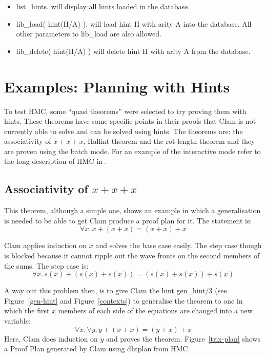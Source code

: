 \begin{itemize}

\item list\_hints. will display all hints loaded in the database.

\item lib\_load( hint(H/A) ). will load hint H with arity A into the
database. All other parameters to lib\_load are also allowed.

\item lib\_delete( hint(H/A) ) will delete hint H with arity A from the
database.

\end{itemize}

\section{Examples: Planning with Hints}

        To test HMC, some ``quasi theorems'' were selected to try
proving them with hints. These theorems have some specific points in
their proofs that Clam is not currently able to solve and can be solved
using hints. The theorems are: the associativity of $x+x+x$, Halfint
theorem and the rot-length theorem and they are proven using the batch
mode. For an example of the interactive mode refer to the long
description of HMC in \cite{negrete-msc}.


\subsection{Associativity of $x+x+x$}

        This theorem, although a simple one, shows an example in which a
generalisation is needed to be able to get Clam produce a proof plan
for it. The statement is:
\begin{equation}
\label{trix-thm}
\forall x.\, x + ( x + x) = (x + x ) + x 
\end{equation}

        Clam applies induction on $x$ and solves the base case easily.
The step case though is blocked because it cannot ripple out the wave
fronts on the second members of the sums. The step case is:
\begin{equation} \label{trix-step} \forall x.\, s(x) + ( s(x) + s(x) )
= ( s(x) + s(x) ) + s(x) \end{equation}

        A way out this problem then, is to give Clam the hint
gen\_hint/3 (see Figure~\ref{gen-hint} and Figure~\ref{contexts}) to
generalise the theorem to one in which the first $x$ members of each
side of the equations are changed into a new variable:
\begin{equation} \label{trix-gen} \forall x.\, \forall y.\, y + ( x + x
) = ( y + x ) + x \end{equation} Here, Clam does induction on $y$ and
proves the theorem. Figure~\ref{trix-plan} shows a Proof Plan generated
by Clam using dhtplan from HMC.

